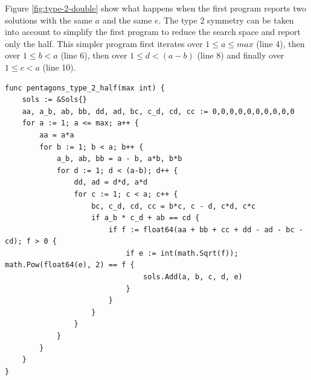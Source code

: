 \documentclass[11pt]{article}
\begin{document}
Figure \ref{fig:type-2-double} show what happens when the first program reports
two solutions with the same $a$ and the same $e$. 
The type 2 symmetry can be taken into account to simplify the first program
to reduce the search space and report only the half. This simpler program first iterates
over $1 \leq a \leq max$ (line 4),
then over $1 \leq b < a$ (line 6),
then over $1 \leq d < (a-b)$ (line 8)
and finally over $1 \leq c < a$ (line 10).

\begin{lstlisting}
func pentagons_type_2_half(max int) {
	sols := &Sols{}
	aa, a_b, ab, bb, dd, ad, bc, c_d, cd, cc := 0,0,0,0,0,0,0,0,0,0
	for a := 1; a <= max; a++ {
		aa = a*a
		for b := 1; b < a; b++ {
			a_b, ab, bb = a - b, a*b, b*b
			for d := 1; d < (a-b); d++ {
				dd, ad = d*d, a*d
				for c := 1; c < a; c++ {
					bc, c_d, cd, cc = b*c, c - d, c*d, c*c
					if a_b * c_d + ab == cd {
						if f := float64(aa + bb + cc + dd - ad - bc - cd); f > 0 {
							if e := int(math.Sqrt(f)); math.Pow(float64(e), 2) == f {
								sols.Add(a, b, c, d, e)
							}
						}
					}
				}
			}
		}
	}
}
\end{lstlisting}
\end{document}
